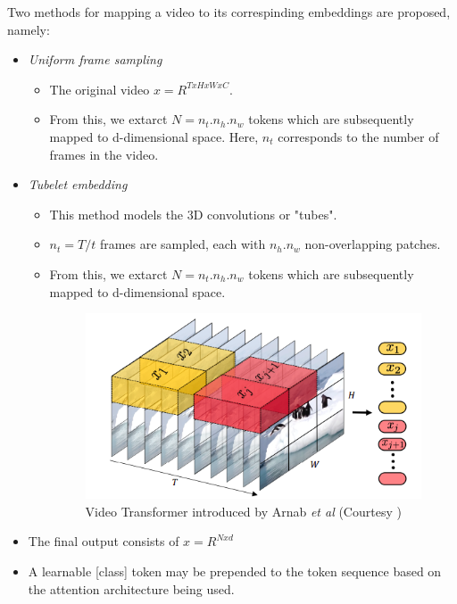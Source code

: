 \par Two methods for mapping a video to its correspinding embeddings are proposed, namely:
\begin{itemize}
    \item \textit{Uniform frame sampling}
    \begin{itemize}
        \item The original video $x = R^{TxHxWxC}$.
        \item From this, we extarct $N = n_t.n_h.n_w$ tokens which are subsequently mapped to d-dimensional space. Here, $n_t$ corresponds to the number of frames in the video.
    \end{itemize} 
    \item \textit{Tubelet embedding}
    \begin{itemize}
        \item This method models the 3D convolutions or "tubes".
        \item $n_t = T/t$ frames are sampled, each with $n_h.n_w$ non-overlapping patches.
        \item From this, we extarct $N = n_t.n_h.n_w$ tokens which are subsequently mapped to d-dimensional space.

        \begin{figure}
            \centering
            \includegraphics[width=\linewidth]{assets/img/vivit-tublet-embed.png}
            \caption{Video Transformer introduced by Arnab \textit{et al} (Courtesy \cite{vivit})}
        \end{figure}

    \end{itemize} 
    \item The final output consists of $x = R^{Nxd}$
    \item A learnable [class] token may be prepended to the token sequence based on the attention architecture being used.
\end{itemize}
\par

